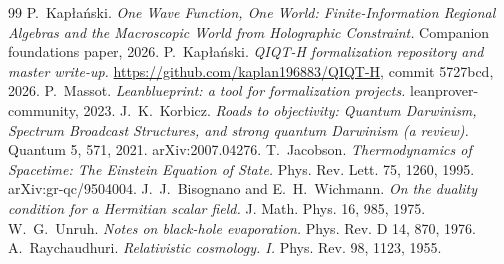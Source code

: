 \documentclass[11pt]{article}
\begin{document}
\begin{thebibliography}{99}
 P.~Kap\l{}a\'nski. \emph{One Wave Function, One World: Finite-Information Regional Algebras and the Macroscopic World from Holographic Constraint.} Companion foundations paper, 2026.
 P.~Kap\l{}a\'nski. \emph{QIQT-H formalization repository and master write-up.} \url{https://github.com/kaplan196883/QIQT-H}, commit 5727bcd, 2026.
 P.~Massot. \emph{Leanblueprint: a tool for formalization projects.} leanprover-community, 2023.
 J.~K.~Korbicz. \emph{Roads to objectivity: Quantum Darwinism, Spectrum Broadcast Structures, and strong quantum Darwinism (a review).} Quantum 5, 571, 2021. arXiv:2007.04276.
 T.~Jacobson. \emph{Thermodynamics of Spacetime: The Einstein Equation of State.} Phys. Rev. Lett. 75, 1260, 1995. arXiv:gr-qc/9504004.
 J.~J.~Bisognano and E.~H.~Wichmann. \emph{On the duality condition for a Hermitian scalar field.} J. Math. Phys. 16, 985, 1975.
 W.~G.~Unruh. \emph{Notes on black-hole evaporation.} Phys. Rev. D 14, 870, 1976.
 A.~Raychaudhuri. \emph{Relativistic cosmology. I.} Phys. Rev. 98, 1123, 1955.

\end{thebibliography}
\end{document}
